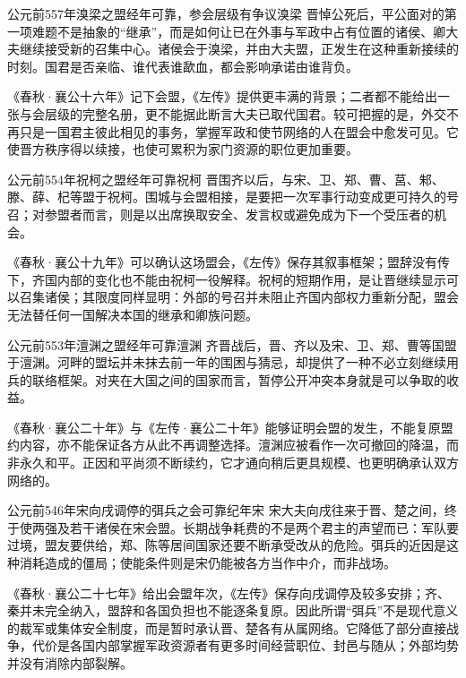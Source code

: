 \begin{event}{公元前557年}{溴梁之盟}{经年可靠，参会层级有争议}{溴梁}
晋悼公死后，平公面对的第一项难题不是抽象的“继承”，而是如何让已在外事与军政中占有位置的诸侯、卿大夫继续接受新的召集中心。诸侯会于溴梁，并由大夫盟，正发生在这种重新接续的时刻。国君是否亲临、谁代表谁歃血，都会影响承诺由谁背负。

《春秋·襄公十六年》记下会盟，《左传》提供更丰满的背景；二者都不能给出一张与会层级的完整名册，更不能据此断言大夫已取代国君。较可把握的是，外交不再只是一国君主彼此相见的事务，掌握军政和使节网络的人在盟会中愈发可见。它使晋方秩序得以续接，也使可累积为家门资源的职位更加重要。
\end{event}

\begin{event}{公元前554年}{祝柯之盟}{经年可靠}{祝柯}
晋围齐以后，与宋、卫、郑、曹、莒、邾、滕、薛、杞等盟于祝柯。围城与会盟相接，是要把一次军事行动变成更可持久的号召；对参盟者而言，则是以出席换取安全、发言权或避免成为下一个受压者的机会。

《春秋·襄公十九年》可以确认这场盟会，《左传》保存其叙事框架；盟辞没有传下，齐国内部的变化也不能由祝柯一役解释。祝柯的短期作用，是让晋继续显示可以召集诸侯；其限度同样显明：外部的号召并未阻止齐国内部权力重新分配，盟会无法替任何一国解决本国的继承和卿族问题。
\end{event}

\begin{event}{公元前553年}{澶渊之盟}{经年可靠}{澶渊}
齐晋战后，晋、齐以及宋、卫、郑、曹等国盟于澶渊。河畔的盟坛并未抹去前一年的围困与猜忌，却提供了一种不必立刻继续用兵的联络框架。对夹在大国之间的国家而言，暂停公开冲突本身就是可以争取的收益。

《春秋·襄公二十年》与《左传·襄公二十年》能够证明会盟的发生，不能复原盟约内容，亦不能保证各方从此不再调整选择。澶渊应被看作一次可撤回的降温，而非永久和平。正因和平尚须不断续约，它才通向稍后更具规模、也更明确承认双方网络的。
\end{event}

\begin{event}{公元前546年}{宋向戌调停的弭兵之会}{可靠纪年}{宋}
宋大夫向戌往来于晋、楚之间，终于使两强及若干诸侯在宋会盟。长期战争耗费的不是两个君主的声望而已：军队要过境，盟友要供给，郑、陈等居间国家还要不断承受改从的危险。弭兵的近因是这种消耗造成的僵局；使能条件则是宋仍能被各方当作中介，而非战场。

《春秋·襄公二十七年》给出会盟年次，《左传》保存向戌调停及较多安排；齐、秦并未完全纳入，盟辞和各国负担也不能逐条复原。因此所谓“弭兵”不是现代意义的裁军或集体安全制度，而是暂时承认晋、楚各有从属网络。它降低了部分直接战争，代价是各国内部掌握军政资源者有更多时间经营职位、封邑与随从；外部均势并没有消除内部裂解。
\end{event}

